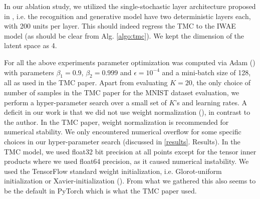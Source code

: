 In our ablation study, we utilized the single-stochastic layer architecture proposed in \cite{iwae}, i.e. the recognition and generative model have two deterministic layers each, with 200 units per layer. This should indeed regress the TMC to the IWAE model (as should be clear from Alg. \ref{algo:tmc}). We kept the dimension of the latent space as 4.

For all the above experiments parameter optimization was computed via Adam (\cite{adam}) with parameters $\beta_1=0.9$, $\beta_2=0.999$ and $\epsilon=10^{-4}$ and a mini-batch size of 128, all as used in the TMC paper. Apart from evaluating $K=20$, the only choice of number of samples in the TMC paper for the MNIST dataset evaluation, we perform a hyper-parameter search over a small set of $K$'s and learning rates. A deficit in our work is that we did not use weight normalization (\cite{weightnorm}), in contrast to the author. In the TMC paper, weight normalization is recommended for numerical stability. We only encountered numerical overflow for some specific choices in our hyper-parameter search (discussed in \ref{results}. Results). In the TMC model, we used float32 bit precision at all points except for the tensor inner products where we used float64 precision, as it caused numerical instability. We used the TensorFlow standard weight initialization, i.e. Glorot-uniform initialization or Xavier-initialization (\cite{xavier}). From what we gathered this also seems to be the default in PyTorch which is what the TMC paper used.

